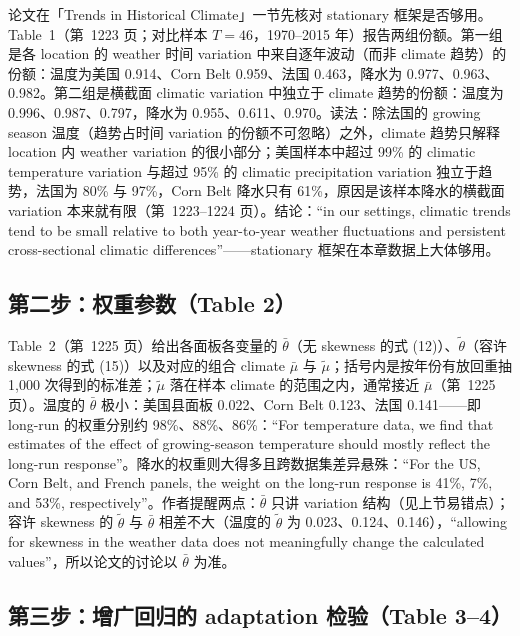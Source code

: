 论文在「Trends in Historical Climate」一节先核对 stationary 框架是否够用。Table~1（第~1223 页；对比样本 $T=46$，1970--2015 年）报告两组份额。第一组是各 location 的 weather 时间 variation 中来自逐年波动（而非 climate 趋势）的份额：温度为美国 0.914、Corn Belt 0.959、法国 0.463，降水为 0.977、0.963、0.982。第二组是横截面 climatic variation 中独立于 climate 趋势的份额：温度为 0.996、0.987、0.797，降水为 0.955、0.611、0.970。读法：除法国的 growing season 温度（趋势占时间 variation 的份额不可忽略）之外，climate 趋势只解释 location 内 weather variation 的很小部分；美国样本中超过 99\% 的 climatic temperature variation 与超过 95\% 的 climatic precipitation variation 独立于趋势，法国为 80\% 与 97\%，Corn Belt 降水只有 61\%，原因是该样本降水的横截面 variation 本来就有限（第~1223--1224 页）。结论：``in our settings, climatic trends tend to be small relative to both year-to-year weather fluctuations and persistent cross-sectional climatic differences''\citep[第~1224 页]{merel2021climate}——stationary 框架在本章数据上大体够用。

\subsection{第二步：权重参数（Table 2）}

Table~2（第~1225 页）给出各面板各变量的 $\bar\theta$（无 skewness 的式 (12)）、$\tilde\theta$（容许 skewness 的式 (15)）以及对应的组合 climate $\bar\mu$ 与 $\tilde\mu$；括号内是按年份有放回重抽 1{,}000 次得到的标准差；$\tilde\mu$ 落在样本 climate 的范围之内，通常接近 $\bar\mu$（第~1225 页）。温度的 $\bar\theta$ 极小：美国县面板 0.022、Corn Belt 0.123、法国 0.141——即 long-run 的权重分别约 98\%、88\%、86\%：``For temperature data, we find that estimates of the effect of growing-season temperature should mostly reflect the long-run response''\citep[第~1225 页]{merel2021climate}。降水的权重则大得多且跨数据集差异悬殊：``For the US, Corn Belt, and French panels, the weight on the long-run response is 41\%, 7\%, and 53\%, respectively''\citep[第~1225 页]{merel2021climate}。作者提醒两点：$\bar\theta$ 只讲 variation 结构（见上节易错点）；容许 skewness 的 $\tilde\theta$ 与 $\bar\theta$ 相差不大（温度的 $\tilde\theta$ 为 0.023、0.124、0.146），``allowing for skewness in the weather data does not meaningfully change the calculated values''\citep[第~1225 页]{merel2021climate}，所以论文的讨论以 $\bar\theta$ 为准。

\subsection{第三步：增广回归的 adaptation 检验（Table 3--4）}

